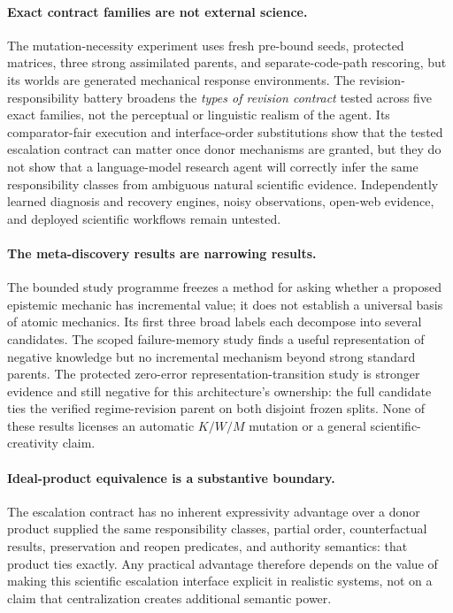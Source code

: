 \paragraph{Exact contract families are not external science.}
The mutation-necessity experiment uses fresh pre-bound seeds, protected
matrices, three strong assimilated parents, and separate-code-path rescoring,
but its
worlds are generated mechanical response environments. The
revision-responsibility battery broadens the \emph{types of revision contract}
tested across five exact families, not the perceptual or linguistic realism of
the agent. Its comparator-fair execution and interface-order substitutions show
that the tested escalation contract can matter once donor mechanisms are
granted, but they do not show that a language-model research agent will
correctly infer the same responsibility classes from ambiguous natural
scientific evidence. Independently learned diagnosis and recovery engines, noisy
observations, open-web evidence, and deployed scientific workflows remain
untested.

\paragraph{The meta-discovery results are narrowing results.}
The bounded study programme freezes a method for asking whether a proposed
epistemic mechanic has incremental value; it does not establish a universal
basis of atomic mechanics. Its first three broad labels each decompose into
several candidates. The scoped failure-memory study finds a useful
representation of negative knowledge but no incremental mechanism beyond strong
standard parents. The protected zero-error representation-transition study is
stronger evidence and still negative for this architecture's ownership: the full
candidate ties the verified regime-revision parent on both disjoint frozen
splits. None of these results licenses an automatic $K/W/M$ mutation or a
general scientific-creativity claim.

\paragraph{Ideal-product equivalence is a substantive boundary.}
The escalation contract has no inherent expressivity advantage over a donor
product supplied the same responsibility classes, partial order, counterfactual
results, preservation and reopen predicates, and authority semantics: that
product ties exactly. Any practical advantage therefore depends on the value of
making this scientific escalation interface explicit in realistic systems, not
on a claim that centralization creates additional semantic power.

